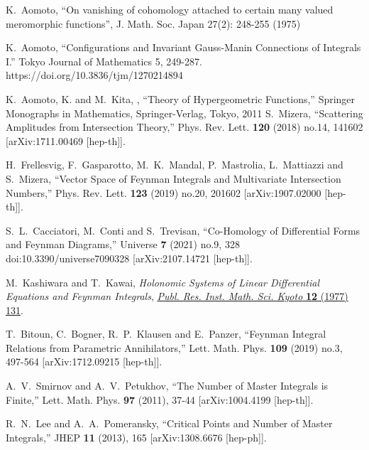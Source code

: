 \documentclass[a4paper,12pt]{article}
\numberwithin{equation}{section}
\numberwithin{figure}{section}
\begin{document}
\begin{thebibliography}{99}
   K.~Aomoto, ``On vanishing of cohomology attached to
    certain many valued meromorphic functions'', J. Math. Soc. Japan
    27(2): 248-255 (1975)

  
  K.~Aomoto, ``Configurations and Invariant Gauss-Manin Connections of Integrals I.'' Tokyo Journal of Mathematics 5, 249-287. https://doi.org/10.3836/tjm/1270214894

     K.~Aomoto, K. and M.~Kita, , ``Theory of Hypergeometric Functions,'' Springer Monographs in Mathematics, Springer-Verlag, Tokyo, 2011
S.~Mizera,
``Scattering Amplitudes from Intersection Theory,''
Phys. Rev. Lett. \textbf{120} (2018) no.14, 141602
[arXiv:1711.00469 [hep-th]].

H.~Frellesvig, F.~Gasparotto, M.~K.~Mandal, P.~Mastrolia, L.~Mattiazzi and S.~Mizera,
``Vector Space of Feynman Integrals and Multivariate Intersection Numbers,''
Phys. Rev. Lett. \textbf{123} (2019) no.20, 201602
[arXiv:1907.02000 [hep-th]].
    
S.~L.~Cacciatori, M.~Conti and S.~Trevisan,
``Co-Homology of Differential Forms and Feynman Diagrams,''
Universe \textbf{7} (2021) no.9, 328
doi:10.3390/universe7090328
[arXiv:2107.14721 [hep-th]].
  


M.~Kashiwara and T.~Kawai, \emph{{Holonomic Systems of Linear Differential
		Equations and Feynman Integrals}},
\href{https://doi.org/10.2977/prims/1195196602}{\emph{Publ. Res. Inst. Math.
		Sci. Kyoto} {\bfseries 12} (1977) 131}.

  
T.~Bitoun, C.~Bogner, R.~P.~Klausen and E.~Panzer,
``Feynman Integral Relations from Parametric Annihilators,''
Lett. Math. Phys. \textbf{109} (2019) no.3, 497-564
[arXiv:1712.09215 [hep-th]].

A.~V.~Smirnov and A.~V.~Petukhov,
``The Number of Master Integrals is Finite,''
Lett. Math. Phys. \textbf{97} (2011), 37-44
[arXiv:1004.4199 [hep-th]].



R.~N.~Lee and A.~A.~Pomeransky,
``Critical Points and Number of Master Integrals,''
JHEP \textbf{11} (2013), 165
[arXiv:1308.6676 [hep-ph]].




\end{thebibliography}
\end{document}

